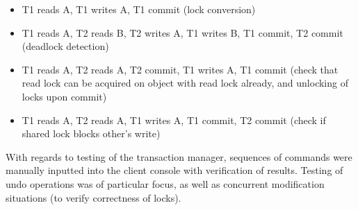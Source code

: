 \documentclass[11pt]{article}
\begin{document}
\begin{itemize}
\item T1 reads A, T1 writes A, T1 commit (lock conversion)
\item T1 reads A, T2 reads B, T2 writes A, T1 writes B, T1 commit, T2 commit (deadlock detection)
\item T1 reads A, T2 reads A, T2 commit, T1 writes A, T1 commit (check that read lock can be acquired on object with read lock already, and unlocking of locks upon commit)
\item T1 reads A, T2 reads A, T1 writes A, T1 commit, T2 commit (check if shared lock blocks other's write)
\end{itemize}

With regards to testing of the transaction manager, sequences of commands were manually inputted into the client console with verification of results. Testing of undo operations was of particular focus, as well as concurrent modification situations (to verify correctness of locks).
\end{document}
